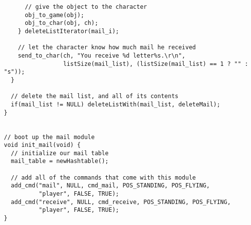 \documentclass[12pt]{article}
\begin{document}
{\begin{verbatim}
      // give the object to the character
      obj_to_game(obj);
      obj_to_char(obj, ch);
    } deleteListIterator(mail_i);

    // let the character know how much mail he received
    send_to_char(ch, "You receive %d letter%s.\r\n", 
                 listSize(mail_list), (listSize(mail_list) == 1 ? "" : "s"));
  }
      
  // delete the mail list, and all of its contents
  if(mail_list != NULL) deleteListWith(mail_list, deleteMail);
}


// boot up the mail module
void init_mail(void) {
  // initialize our mail table
  mail_table = newHashtable();

  // add all of the commands that come with this module
  add_cmd("mail", NULL, cmd_mail, POS_STANDING, POS_FLYING,
          "player", FALSE, TRUE);
  add_cmd("receive", NULL, cmd_receive, POS_STANDING, POS_FLYING,
          "player", FALSE, TRUE);
}
\end{verbatim}}
\end{document}
